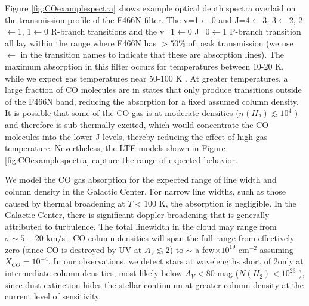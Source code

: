 \documentclass[times,astrosymb,twocolumn]{aastex631}
\def\rr#1{#1}
\begin{document}
Figure \ref{fig:COexamplespectra} shows example optical depth spectra overlaid on the transmission profile of the F466N filter.
\rr{The v=1$\leftarrow$0 and J=4$\leftarrow$3, 3$\leftarrow$2, 2$\leftarrow$1, 1$\leftarrow$0 R-branch transitions and the v=1$\leftarrow$0 J=0$\leftarrow$1 
 P-branch} transition all lay within the range \rr{where} F466N has $>50$\% of peak transmission \rr{(we use $\leftarrow$ in the transition names to indicate that these are absorption lines)}.
The maximum absorption in this filter occurs for temperatures between 10-20 K, while we expect \rr{gas} temperatures near 50-100 K \citep{Ginsburg2016,Immer2012,Krieger2017}.
At \rr{greater} temperatures, a large fraction of CO molecules are in states that only produce transitions outside of the F466N band, reducing the absorption \rr{for a fixed assumed column density}.
It is \rr{possible} that \rr{some} of the CO gas is at moderate densities ($n(H_2)\lesssim10^4$ \percc) and therefore is sub-thermally excited, which would concentrate the CO molecules into the lower-J levels, \rr{thereby reducing the effect of high gas temperature}.
Nevertheless, the LTE models shown in Figure \ref{fig:COexamplespectra} capture the range of expected behavior.

We model the CO gas absorption for the expected range of line width and column density in the Galactic Center.
For narrow line width\rr{s}, such as \rr{those} caused by thermal broadening at $T<100$ K, the absorption is negligible.
In the Galactic Center, there is significant doppler broadening that is generally attributed to turbulence.
The total linewidth in the cloud may range from $\sigma\sim5-20$ km/s \citep{Henshaw2019}.
CO column densities will span the full range from effectively zero (since CO is destroyed by UV at $A_V \lesssim 2$) to $\sim$ a few$\times10^{19}$ cm$^{-2}$ \citep{Rathborne2015} assuming $X_{CO}=10^{-4}$.
In our observations, we detect stars \rr{at wavelengths} short of 2\um only at intermediate column densities, most likely below $A_V<80$ mag ($N(H_2) < 10^{23}$ \persc), since dust extinction hides the stellar continuum at \rr{greater} column density \rr{at the current level of sensitivity}.
\end{document}
